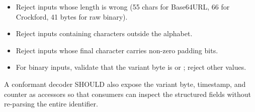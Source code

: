 \begin{itemize}
  \item Reject inputs whose length is wrong (55 chars for Base64URL, 66 for Crockford, 41 bytes for raw binary).
  \item Reject inputs containing characters outside the alphabet.
  \item Reject inputs whose final character carries non-zero padding bits.
  \item For binary inputs, validate that the variant byte is  or ; reject other values.
\end{itemize}

A conformant decoder SHOULD also expose the variant byte, timestamp, and counter as accessors so that consumers can inspect the structured fields without re-parsing the entire identifier.


